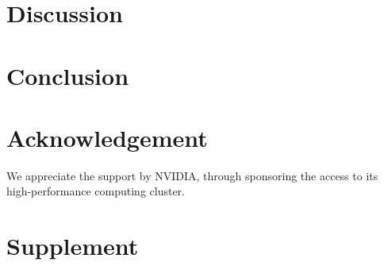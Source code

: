 \documentclass[5p, twocolumn, times, sort&compress]{elsarticle}
\begin{document}
    \section{Discussion}
    

    \section{Conclusion}
    

    \section*{Acknowledgement}
    We appreciate the support by NVIDIA, through sponsoring the access to its high-performance computing cluster.

    

    \appendix
    \section{Supplement}
    
\end{document}
